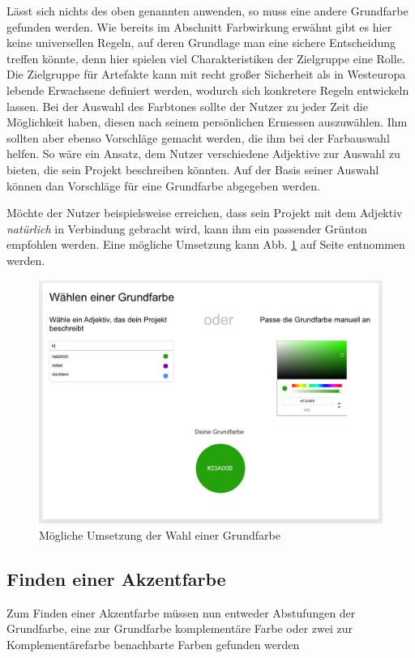Lässt sich nichts des oben genannten anwenden, so muss eine andere Grundfarbe gefunden werden. Wie bereits im Abschnitt Farbwirkung erwähnt gibt es hier keine universellen Regeln, auf deren Grundlage man eine sichere Entscheidung treffen könnte, denn hier spielen viel Charakteristiken der Zielgruppe eine Rolle. Die Zielgruppe für Artefakte kann mit recht großer Sicherheit als in Westeuropa lebende Erwachsene definiert werden, wodurch sich konkretere Regeln entwickeln lassen.
Bei der Auswahl des Farbtones sollte der Nutzer zu jeder Zeit die Möglichkeit haben, diesen nach seinem persönlichen Ermessen auszuwählen. Ihm sollten aber ebenso Vorschläge gemacht werden, die ihm bei der Farbauswahl helfen. So wäre ein Ansatz, dem Nutzer verschiedene Adjektive zur Auswahl zu bieten, die sein Projekt beschreiben könnten. Auf der Basis seiner Auswahl können dan Vorschläge für eine Grundfarbe abgegeben werden.

Möchte der Nutzer beispielsweise erreichen, dass sein Projekt mit dem Adjektiv \textit{natürlich} in Verbindung gebracht wird, kann ihm ein passender Grünton empfohlen werden. Eine mögliche Umsetzung kann Abb. \ref{fig:wire-base-color} auf Seite \pageref{fig:wire-base-color} entnommen werden.

\begin{figure}[h]
    \centering
    \includegraphics[width=1\textwidth]{images/wireframe-base-color.png}
    \caption{Mögliche Umsetzung der Wahl einer Grundfarbe}
    \label{fig:wire-base-color}
\end{figure}

\subsection{Finden einer Akzentfarbe}
Zum Finden einer Akzentfarbe müssen nun entweder Abstufungen der Grundfarbe, eine zur Grundfarbe komplementäre Farbe oder zwei zur Komplementärefarbe benachbarte Farben gefunden werden

